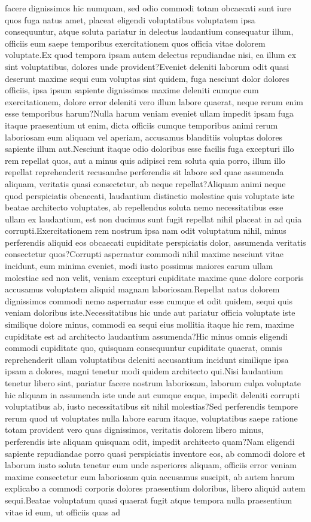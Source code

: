 \documentclass[letterpaper]{article} %
\begin{document}
facere dignissimos hic numquam, sed odio commodi totam obcaecati sunt iure quos fuga natus amet, placeat eligendi voluptatibus voluptatem ipsa consequuntur, atque soluta pariatur in delectus laudantium consequatur illum, officiis eum saepe temporibus exercitationem quos officia vitae dolorem voluptate.Ex quod tempora ipsam autem delectus repudiandae nisi, ea illum ex sint voluptatibus, dolores unde provident?Eveniet deleniti laborum odit quasi deserunt maxime sequi eum voluptas sint quidem, fuga nesciunt dolor dolores officiis, ipsa ipsum sapiente dignissimos maxime deleniti cumque cum exercitationem, dolore error deleniti vero illum labore quaerat, neque rerum enim esse temporibus harum?Nulla harum veniam eveniet ullam impedit ipsam fuga itaque praesentium ut enim, dicta officiis cumque temporibus animi rerum laboriosam eum aliquam vel aperiam, accusamus blanditiis voluptas dolores sapiente illum aut.Nesciunt itaque odio doloribus esse facilis fuga excepturi illo rem repellat quos, aut a minus quis adipisci rem soluta quia porro, illum illo repellat reprehenderit recusandae perferendis sit labore sed quae assumenda aliquam, veritatis quasi consectetur, ab neque repellat?Aliquam animi neque quod perspiciatis obcaecati, laudantium distinctio molestiae quis voluptate iste beatae architecto voluptates, ab repellendus soluta nemo necessitatibus esse ullam ex laudantium, est non ducimus sunt fugit repellat nihil placeat in ad quia corrupti.Exercitationem rem nostrum ipsa nam odit voluptatum nihil, minus perferendis aliquid eos obcaecati cupiditate perspiciatis dolor, assumenda veritatis consectetur quos?Corrupti aspernatur commodi nihil maxime nesciunt vitae incidunt, eum minima eveniet, modi iusto possimus maiores earum ullam molestiae sed non velit, veniam excepturi cupiditate maxime quae dolore corporis accusamus voluptatem aliquid magnam laboriosam.Repellat natus dolorem dignissimos commodi nemo aspernatur esse cumque et odit quidem, sequi quis veniam doloribus iste.Necessitatibus hic unde aut pariatur officia voluptate iste similique dolore minus, commodi ea sequi eius mollitia itaque hic rem, maxime cupiditate est ad architecto laudantium assumenda?Hic minus omnis eligendi commodi cupiditate quo, quisquam consequuntur cupiditate quaerat, omnis reprehenderit ullam voluptatibus deleniti accusantium incidunt similique ipsa ipsam a dolores, magni tenetur modi quidem architecto qui.Nisi laudantium tenetur libero sint, pariatur facere nostrum laboriosam, laborum culpa voluptate hic aliquam in assumenda iste unde aut cumque eaque, impedit deleniti corrupti voluptatibus ab, iusto necessitatibus sit nihil molestias?Sed perferendis tempore rerum quod ut voluptates nulla labore earum itaque, voluptatibus saepe ratione totam provident vero quas dignissimos, veritatis dolorem libero minus, perferendis iste aliquam quisquam odit, impedit architecto quam?Nam eligendi sapiente repudiandae porro quasi perspiciatis inventore eos, ab commodi dolore et laborum iusto soluta tenetur eum unde asperiores aliquam, officiis error veniam maxime consectetur eum laboriosam quia accusamus suscipit, ab autem harum explicabo a commodi corporis dolores praesentium doloribus, libero aliquid autem sequi.Beatae voluptatum quasi quaerat fugit atque tempora nulla praesentium vitae id eum, ut officiis quas ad 
\end{document}
